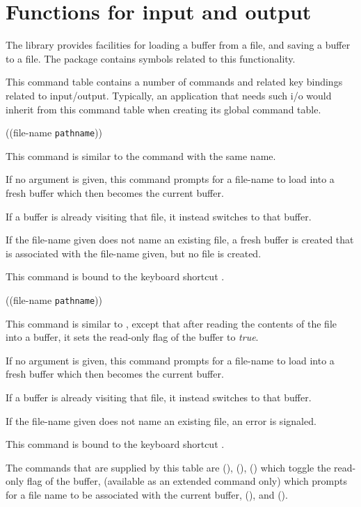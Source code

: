 \chapter{Functions for input and output}

The \sysname{} library provides facilities for loading a buffer from a
file, and saving a buffer to a file.  The  package
contains symbols related to this functionality.


This command table contains a number of commands and related key
bindings related to input/output.  Typically, an application that
needs such i/o would inherit from this command table when creating its
global command table.

 {((file-name \texttt{pathname}))}

This command is similar to the \emacs{} command with the same name.

If no argument is given, this command prompts for a file-name to load
into a fresh buffer which then becomes the current buffer.

If a buffer is already visiting that file, it instead switches to that
buffer.

If the file-name given does not name an existing file, a fresh buffer
is created that is associated with the file-name given, but no file is
created.

This command is bound to the keyboard shortcut .

 {((file-name \texttt{pathname}))}

This command is similar to , except that after
reading the contents of the file into a buffer, it sets the read-only
flag of the buffer to \emph{true}.

If no argument is given, this command prompts for a file-name to load
into a fresh buffer which then becomes the current buffer.

If a buffer is already visiting that file, it instead switches to that
buffer.

If the file-name given does not name an existing file, an error is
signaled.

This command is bound to the keyboard shortcut .

The commands that are supplied by this table
are  (),
 (),
 () which toggle the read-only
flag of the buffer,  (available as
an extended command only) which prompts for a file name to be
associated with the current buffer, 
(), and  ().

